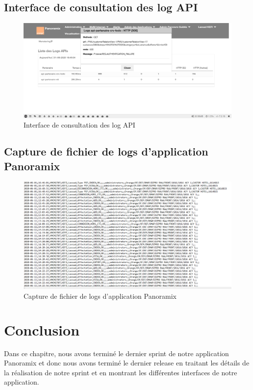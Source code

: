 \subsection{Interface de consultation des log API}
\begin{figure}[H]
	\centering
	\includegraphics[width=0.7\linewidth]{"img/screenshots/logs + srcd/detailed log"}
	\caption[Interface de consultation des log API]{Interface de consultation des log API}
	\label{fig:detailed-log}
\end{figure}

\subsection{Capture de fichier de logs d’application Panoramix}

\begin{figure}[H]
	\centering
	\includegraphics[width=1\linewidth]{"img/screenshots/logs + srcd/log-application"}
	\caption[Capture de fichier de logs d’application Panoramix]{Capture de fichier de logs d’application Panoramix}
	\label{fig:log-application}
\end{figure}

\section*{Conclusion}
Dans ce chapitre, nous avons terminé le dernier sprint de notre application Panoramix et donc nous avons terminé le dernier release en traitant les détails de la réalisation de notre sprint et en montrant les différentes interfaces de notre application.






